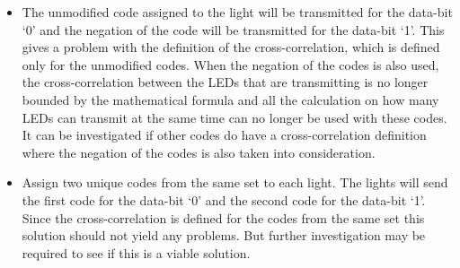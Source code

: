 	\begin{itemize}
		\item The unmodified code assigned to the light will be transmitted for the data-bit `0' and the negation of the code will be transmitted for the data-bit `1'. 
		This gives a problem with the definition of the cross-correlation, which is defined only for the unmodified codes. 
		When the negation of the codes is also used, the cross-correlation between the LEDs that are transmitting is no longer bounded by the mathematical formula and all the calculation on how many LEDs can transmit at the same time can no longer be used with these codes.
		It can be investigated if other codes do have a cross-correlation definition where the negation of the codes is also taken into consideration.

		\item Assign two unique codes from the same set to each light. 
		The lights will send the first code for the data-bit `0' and the second code for the data-bit `1'.
		Since the cross-correlation is defined for the codes from the same set this solution should not yield any problems.
		But further investigation may be required to see if this is a viable solution.
	\end{itemize}


	












